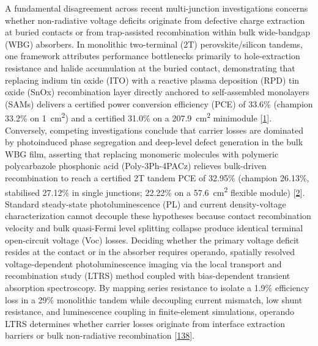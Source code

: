 \documentclass[
  11pt,
]{article}
\begin{document}
A fundamental disagreement across recent multi-junction investigations
concerns whether non-radiative voltage deficits originate from defective
charge extraction at buried contacts or from trap-assisted recombination
within bulk wide-bandgap (WBG) absorbers. In monolithic two-terminal
(2T) perovskite/silicon tandems, one framework attributes performance
bottlenecks primarily to hole-extraction resistance and halide
accumulation at the buried contact, demonstrating that replacing indium
tin oxide (ITO) with a reactive plasma deposition (RPD) tin oxide (SnOx)
recombination layer directly anchored to self-assembled monolayers
(SAMs) delivers a certified power conversion efficiency (PCE) of 33.6\%
(champion 33.2\% on \qty{1}{\centi\meter\squared}) and a certified
31.0\% on a \qty{207.9}{\centi\meter\squared} minimodule
{[}\href{https://doi.org/10.1126/science.aef5355}{1}{]}. Conversely,
competing investigations conclude that carrier losses are dominated by
photoinduced phase segregation and deep-level defect generation in the
bulk WBG film, asserting that replacing monomeric molecules with
polymeric polycarbazole phosphonic acid (Poly-3Ph-4PACz) relieves
bulk-driven recombination to reach a certified 2T tandem PCE of 32.95\%
(champion 26.13\%, stabilised 27.12\% in single junctions; 22.22\% on a
\qty{57.6}{\centi\meter\squared} flexible module)
{[}\href{https://doi.org/10.1038/s41467-026-73276-w}{2}{]}. Standard
steady-state photoluminescence (PL) and current density-voltage
characterization cannot decouple these hypotheses because contact
recombination velocity and bulk quasi-Fermi level splitting collapse
produce identical terminal open-circuit voltage (Voc) losses. Deciding
whether the primary voltage deficit resides at the contact or in the
absorber requires operando, spatially resolved voltage-dependent
photoluminescence imaging via the local transport and recombination
study (LTRS) method coupled with bias-dependent transient absorption
spectroscopy. By mapping series resistance to isolate a 1.9\% efficiency
loss in a 29\% monolithic tandem while decoupling current mismatch, low
shunt resistance, and luminescence coupling in finite-element
simulations, operando LTRS determines whether carrier losses originate
from interface extraction barriers or bulk non-radiative recombination
{[}\href{https://doi.org/10.1002/smll.202513958}{138}{]}.
\end{document}
